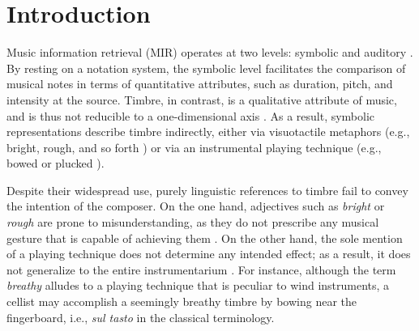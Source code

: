 \documentclass{bmcart}
\makeatletter
\newcommand*{\eg}{e.g.,\@\xspace}
\makeatother
\begin{document}




\section*{Introduction}
\label{sec:intro}

Music information retrieval (MIR) operates at two levels: symbolic and auditory \cite{downie2003mir}.
By resting on a notation system, the symbolic level facilitates the comparison of musical notes in terms of quantitative attributes, such as duration, pitch, and intensity at the source.
Timbre, in contrast, is a qualitative attribute of music, and is thus not reducible to a one-dimensional axis \cite{siedenburg2019chapter}.
As a result, symbolic representations describe timbre indirectly, either via visuotactile metaphors (\eg{} bright, rough, and so forth \cite{faure1996icmpc}) or via an instrumental playing technique (\eg{} bowed or plucked \cite{kostka2016book}).

Despite their widespread use, purely linguistic references to timbre fail to convey the intention of the composer.
On the one hand, adjectives such as \emph{bright} or \emph{rough} are prone to misunderstanding, as they do not prescribe any musical gesture that is capable of achieving them \cite{antoine2018isma}.
On the other hand, the sole mention of a playing technique does not determine any intended effect; as a result, it does not generalize to the entire instrumentarium \cite{kolozali2011ismir}.
For instance, although the term \emph{breathy} alludes to a playing technique that is peculiar to wind instruments, a cellist may accomplish a seemingly breathy timbre by bowing near the fingerboard, i.e., \emph{sul tasto} in the classical terminology.
\end{document}
